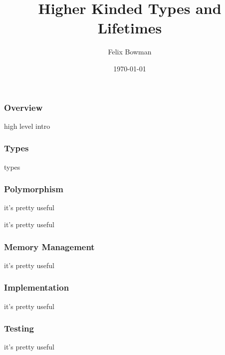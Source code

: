 \documentclass[xcolor=dvipsnames, aspectratio=169]{beamer}
\begin{document}
\title{Higher Kinded Types and Lifetimes}
\author{Felix Bowman}

\date{\today}

\frame{\titlepage}

\begin{frame}
    \frametitle{Overview}
    high level intro
\end{frame}

\begin{frame}
    \frametitle{Types}
    types
\end{frame}

\begin{frame}
    \frametitle{Polymorphism}
    it's pretty useful
\end{frame}

\begin{frame}
    it's pretty useful
\end{frame}

\begin{frame}
    \frametitle{Memory Management}
    it's pretty useful
\end{frame}

\begin{frame}
    \frametitle{Implementation}
    it's pretty useful
\end{frame}

\begin{frame}
    \frametitle{Testing}
    it's pretty useful
\end{frame}
\end{document}
